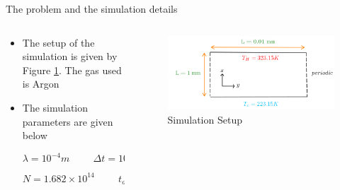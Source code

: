 \documentclass{beamer}
\begin{document}
        \begin{frame}{The problem and the simulation details}
            \begin{columns}
                \begin{column}{0.5\linewidth}
                    \begin{itemize}
                        \setlength\itemsep{0.25cm}
                                
                        \item<1->The setup of the simulation is given by Figure \ref{img:Setup}. The gas used is Argon

                        \item<2->The simulation parameters are given below \cite{rader2005dsmc}

                            \begin{equation*}
                                \lambda = 10^{-4} m \hspace{1cm} \Delta t = 10^{-8} s
                            \end{equation*}

                            \begin{equation*}
                                N = 1.682 \times 10^{14} \hspace{1cm} t_o = 71 ns
                            \end{equation*}
                    \end{itemize}                    
                \end{column} 
            
                \begin{column}{0.5\linewidth}
                    \begin{figure}
                        \centering
                        \includegraphics[width=\linewidth]{Pictures/1D_Fourier_Flow/Setup.png}
                        \caption{Simulation Setup}
                        \label{img:Setup}
                    \end{figure}
                \end{column}
            \end{columns}
        \end{frame}
\end{document}
